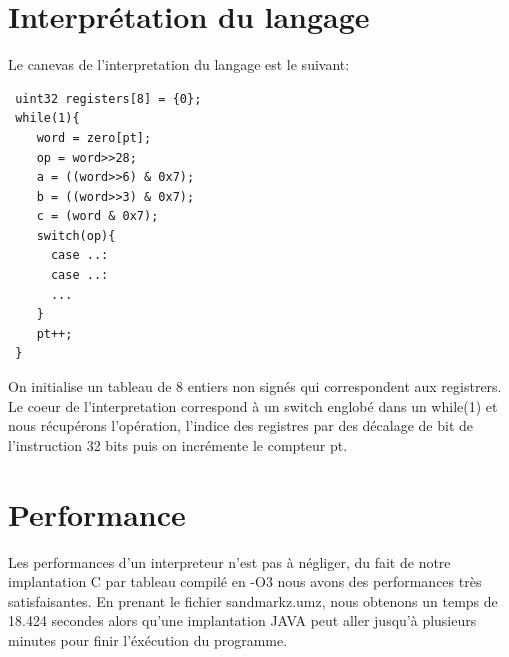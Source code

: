 \documentclass[a4paper,12pt]{report}
\begin{document}
\section{Interprétation du langage}
Le canevas de l'interpretation du langage est le suivant:
\begin{verbatim}
 uint32 registers[8] = {0};
 while(1){
    word = zero[pt];
    op = word>>28;
    a = ((word>>6) & 0x7);
    b = ((word>>3) & 0x7);
    c = (word & 0x7);
    switch(op){
      case ..:
      case ..:
      ...
    }
    pt++;
 }
\end{verbatim}
On initialise un tableau de 8 entiers non signés qui correspondent aux registrers.
Le coeur de l'interpretation correspond à un switch englobé dans un while(1) et nous récupérons l'opération, l'indice des registres 
par des décalage de bit de l'instruction 32 bits puis on incrémente le compteur pt.

\section{Performance}
Les performances d'un interpreteur n'est pas à négliger, du fait de notre implantation C par tableau compilé en -O3 nous avons des
performances très satisfaisantes.
En prenant le fichier sandmarkz.umz, nous obtenons un temps de 18.424 secondes alors qu'une implantation JAVA peut aller jusqu'à 
plusieurs minutes pour finir l'éxécution du programme.
\end{document}
